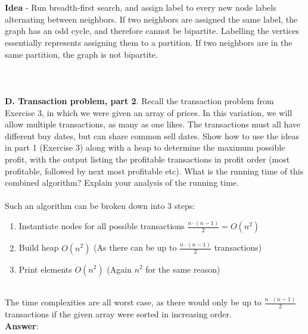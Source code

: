 \documentclass{article}
\begin{document}
	\\
	\\
	\textbf{Idea} - Run breadth-first search, and assign label to every new node labels alternating between neighbors. If two neighbors are assigned the same label, the graph has an odd cycle, and therefore cannot be bipartite. Labelling the vertices essentially represents assigning them to a partition. If two neighbors are in the same partition, the graph is not bipartite.\\
	\\
	\\
	\\
	\textbf{D. Transaction problem, part 2}. Recall the transaction problem from Exercise 3, in which we were given an array of prices. In this variation, we will allow multiple transactions, as many as one likes. The transactions must all have different buy dates, but can share common sell dates. Show how to use the ideas in part 1 (Exercise 3) along with a heap to determine the maximum possible profit, with the output listing the profitable transactions in profit order (most profitable, followed by next most profitable etc). What is the running time of this combined algorithm? Explain your analysis of the running time. \\
	\\
	Such an algorithm can be broken down into 3 steps: \\
	\begin{enumerate}
		\item Instantiate nodes for all possible transactions \qquad \qquad \qquad $\frac{n \cdot (n-1)}{2} = O(n^2)$ 
		\item Build heap \qquad \qquad \qquad \qquad \qquad \qquad \qquad $O(n^2)$ (As there can be up to $\frac{n \cdot (n-1)}{2}$ transactions)
		\item Print elements \qquad \qquad \qquad \qquad \qquad \qquad \qquad $O(n^2)$ (Again $n^2$ for the same reason)
	\end{enumerate}
	
	\noindent \\
	The time complexities are all worst case, as there would only be up to $\frac{n \cdot (n-1)}{2}$ transactions if the given array were sorted in increasing order.\\
	\textbf{Answer}: 
	
\end{document}
